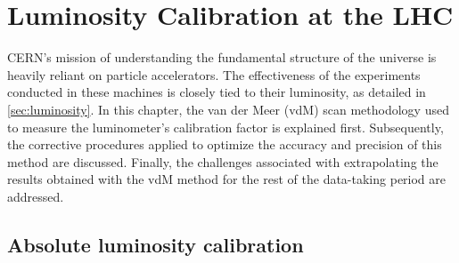 \chapter{Luminosity Calibration at the LHC}

CERN’s mission of understanding the fundamental structure of the universe is heavily reliant on particle accelerators. The effectiveness of the experiments conducted in these machines is closely tied to their luminosity, as detailed in \autoref{sec:luminosity}. 
In this chapter, the van der Meer (vdM) scan methodology used to measure the luminometer's calibration factor is explained first. Subsequently, the corrective procedures applied to optimize the accuracy and precision of this method are discussed. Finally, the challenges associated with extrapolating the results obtained with the vdM method for the rest of the data-taking period are addressed.
\section{Absolute luminosity calibration}
\label{sec:absolute_luminosity_calibration}

